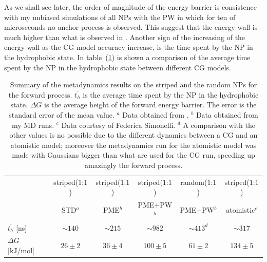 As we shall see later, the order of magnitude of the energy barrier is consistence with my unbiased simulations of all \acp{NP} with the \ac{PW} in which for ten of microseconds no anchor process is observed. This suggest that the energy wall is much higher than what is observed in \cite{ourPaper}. Another sign of the increasing of the energy wall as the \ac{CG} model accuracy increase, is the time spent by the \ac{NP} in the hydrophobic state. In table~(\ref{tab:hydroTime}) is shown a comparison of the average time spent by the \ac{NP} in the hydrophobic state between different \ac{CG} models.
\begin{table}[h!t]
	\centering\footnotesize
	\begin{tabular}{lccccc}
		\toprule
		\,	& striped($1$:$1$)	& striped($1$:$1$)	& striped($1$:$1$)	& random($1$:$1$)	& striped($1$:$1$) 	\\
		\,	& STD$^a$	& \acs{PME}$^b$	& \acs{PME}$+$\acs{PW}$^b$	& \acs{PME}$+$\acs{PW}$^b$ 	& atomistic$^c$		\\ \toprule
	$\overline{t_{h}}$ [ns]	& $\sim 140$& $\sim 215$	& $\sim 982$	& $\sim 413^d$ 	& $\sim 317$		\\ \midrule
	$\Delta G$ [kJ/mol] 	& $26 \pm 2$& $36 \pm 4$	& $100 \pm 5$	& $61 \pm 2$ 	& $134 \pm 5$		\\ \bottomrule
	\end{tabular}
	\caption{Summary of the metadynamics results on the striped and the random \acp{NP} for the forward process. $\overline{t_h}$ is the average time spent by the \acs{NP} in the hydrophobic state. $\Delta G$ is the average height of the forward energy barrier. The error is the standard error of the mean value. $^a$ Data obtained from \cite{ourPaper}. $^b$ Data obtained from my \acs{MD} runs. $^c$ Data courtesy of Federica Simonelli. $^d$ A comparison with the other values is no possible due to the different dynamics between a \ac{CG} and an atomistic model; moreover the metadynamics run for the atomistic model was made with Gaussians bigger than what are used for the \ac{CG} run, speeding up amazingly the forward process.}%
	\label{tab:hydroTime}
\end{table}

